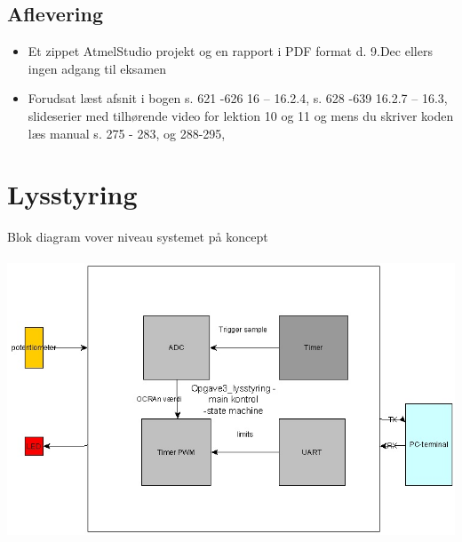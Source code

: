 \documentclass[a4paper,11pt]{article}
\theoremstyle{mytheor}
\begin{document}
\subsection {Aflevering}
\begin{itemize}
\item Et zippet AtmelStudio projekt og en rapport i PDF format d. 9.Dec ellers ingen adgang til eksamen
\item Forudsat læst afsnit i bogen s. 621 -626 16 – 16.2.4, s. 628 -639 16.2.7 – 16.3, slideserier med tilhørende video for lektion 10 og 11 og mens du skriver koden læs manual s. 275 - 283, og 288-295,
\end{itemize}


\clearpage

\section{Lysstyring}
Blok diagram vover  niveau systemet på koncept
\paragraph{}
\includegraphics[scale=0.8]{koncept}
\end{document}
